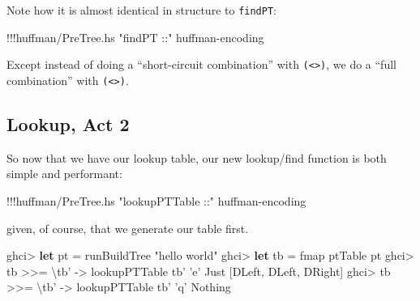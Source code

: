 \documentclass[]{article}
\newenvironment{Shaded}{}{}
\newcommand{\KeywordTok}[1]{\textcolor[rgb]{0.00,0.44,0.13}{\textbf{{#1}}}}
\newcommand{\DataTypeTok}[1]{\textcolor[rgb]{0.56,0.13,0.00}{{#1}}}
\newcommand{\CharTok}[1]{\textcolor[rgb]{0.25,0.44,0.63}{{#1}}}
\newcommand{\StringTok}[1]{\textcolor[rgb]{0.25,0.44,0.63}{{#1}}}
\newcommand{\OtherTok}[1]{\textcolor[rgb]{0.00,0.44,0.13}{{#1}}}
\newcommand{\FunctionTok}[1]{\textcolor[rgb]{0.02,0.16,0.49}{{#1}}}
\newcommand{\NormalTok}[1]{{#1}}
\begin{document}
Note how it is almost identical in structure to \texttt{findPT}:

\begin{Shaded}
\begin{Highlighting}[]
\FunctionTok{!!!}\NormalTok{huffman}\FunctionTok{/}\NormalTok{PreTree.hs }\StringTok{"findPT ::"} \NormalTok{huffman}\FunctionTok{-}\NormalTok{encoding}
\end{Highlighting}
\end{Shaded}

Except instead of doing a ``short-circuit combination'' with
\texttt{(\textless{}\textbar{}\textgreater{})}, we do a ``full
combination'' with \texttt{(\textless{}\textgreater{})}.

\subsection{Lookup, Act 2}\label{lookup-act-2}

So now that we have our lookup table, our new lookup/find function is
both simple and performant:

\begin{Shaded}
\begin{Highlighting}[]
\FunctionTok{!!!}\NormalTok{huffman}\FunctionTok{/}\NormalTok{PreTree.hs }\StringTok{"lookupPTTable ::"} \NormalTok{huffman}\FunctionTok{-}\NormalTok{encoding}
\end{Highlighting}
\end{Shaded}

given, of course, that we generate our table first.

\begin{Shaded}
\begin{Highlighting}[]
\NormalTok{ghci}\FunctionTok{>} \KeywordTok{let} \NormalTok{pt }\FunctionTok{=} \NormalTok{runBuildTree }\StringTok{"hello world"}
\NormalTok{ghci}\FunctionTok{>} \KeywordTok{let} \NormalTok{tb }\FunctionTok{=} \NormalTok{fmap ptTable pt}
\NormalTok{ghci}\FunctionTok{>} \NormalTok{tb }\FunctionTok{>>=} \NormalTok{\textbackslash{}tb' }\OtherTok{->} \NormalTok{lookupPTTable tb' }\CharTok{'e'}
\DataTypeTok{Just} \NormalTok{[}\DataTypeTok{DLeft}\NormalTok{, }\DataTypeTok{DLeft}\NormalTok{, }\DataTypeTok{DRight}\NormalTok{]}
\NormalTok{ghci}\FunctionTok{>} \NormalTok{tb }\FunctionTok{>>=} \NormalTok{\textbackslash{}tb' }\OtherTok{->} \NormalTok{lookupPTTable tb' }\CharTok{'q'}
\DataTypeTok{Nothing}
\end{Highlighting}
\end{Shaded}
\end{document}
